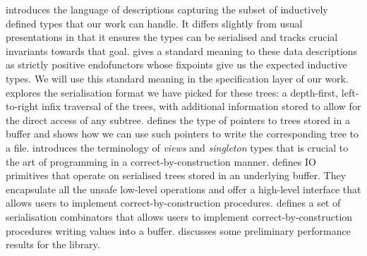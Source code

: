  introduces the language of descriptions capturing the
subset of inductively defined types that our work can handle.
It differs slightly from usual presentations in that it ensures the
types can be serialised and tracks crucial invariants towards that goal.
%
 gives a standard meaning to these data descriptions
as strictly positive endofunctors whose fixpoints give us the expected
inductive types.
%
We will use this standard meaning in the specification layer of our work.
%
 explores the serialisation format we have picked
for these trees: a depth-first, left-to-right infix traversal of the
trees, with additional information stored to allow for the direct access
of any subtree.
%
 defines the type of pointers to trees stored in a
buffer and shows how we can use such pointers to write the corresponding
tree to a file.
%
 introduces the terminology of \emph{views} and
\emph{singleton} types that is crucial to the art of programming
in a correct-by-construction manner.
%
 defines IO primitives that operate on serialised
trees stored in an underlying buffer.
%
They encapsulate all the unsafe low-level operations and offer a
high-level interface that allows users to implement correct-by-construction
procedures.
%
 defines a set of serialisation combinators that
allows users to implement correct-by-construction procedures writing
values into a buffer.
%
 discusses some preliminary performance results for
the library.
